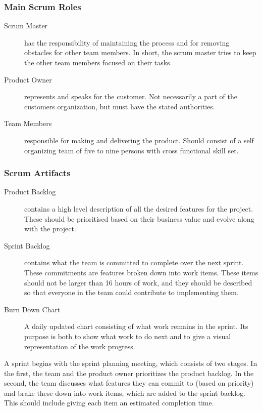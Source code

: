 \subsubsection{Main Scrum Roles}
\begin{description}
	\item[Scrum Master] has the responsibility of maintaining the process and
		for removing obstacles for other team members. In short, the scrum
		master tries to keep the other team members focused on their tasks.
	\item[Product Owner] represents and speaks for the customer. Not
		necessarily a part of the customers organization, but must have the
		stated authorities.
	\item[Team Members] responsible for making and delivering the product.
		Should consist of a self organizing team of five to nine persons with
		cross functional skill set.
\end{description}

\subsubsection{Scrum Artifacts}
\begin{description}
	\item[Product Backlog] contains a high level description of all the desired
		features for the project. These should be prioritised based on their
		business value and evolve along with the project.
	\item[Sprint Backlog] contains what the team is committed to complete over
		the next sprint. These commitments are features broken down into work
		items. These items should not be larger than 16 hours of work, and they
		should be described so that everyone in the team could contribute to
		implementing them.
	\item[Burn Down Chart] A daily updated chart consisting of what work
		remains in the sprint. Its purpose is both to show what work to do next
		and to give a visual representation of the work progress.
\end{description}

A sprint begins with the sprint planning meeting, which consists of two
stages. In the first, the team and the product owner prioritizes the product
backlog. In the second, the team discusses what features they can commit to
(based on priority) and brake these down into work items, which are added to
the sprint backlog. This should include giving each item an estimated
completion time.

